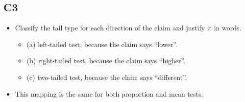 	\subsection*{C3}
	\begin{itemize}
		\item Classify the tail type for each direction of the claim and justify it in words.
		\begin{itemize}
			\item (a) left-tailed test, because the claim says ``lower''.\LeftTailGraph
			\item (b) right-tailed test, because the claim says ``higher''.\RightTailGraph
			\item (c) two-tailed test, because the claim says ``different''.\TwoTailGraph
		\end{itemize}
		\item This mapping is the same for both proportion and mean tests.
	\end{itemize}

